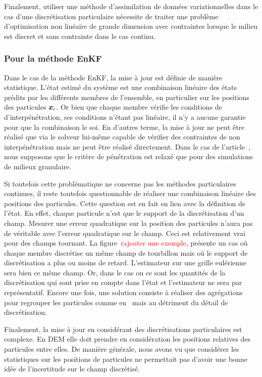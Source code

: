Finalement, utiliser une méthode d'assimilation de données variationnelles dans le cas d'une discrétisation particulaire nécessite de traiter une problème d'optimisation non linéaire de grande dimension avec contraintes lorsque le milieu est discret et sans contrainte dans le cas continu.

\subsubsection{Pour la méthode EnKF}

Dans le cas de la méthode EnKF, la mise à jour est définie de manière statistique. L'état estimé du système est une combinaison linéaire des états prédits par les différents membres de l'ensemble, en particulier sur les positions des particules $\bm{x}_i$. Or bien que chaque membre vérifie les conditions de d'interpénétration, ses conditions n'étant pas linéaire, il n'y a aucune garantie pour que la combinaison le soi.
En d'autres terme, la mise à jour ne peut être réalisé que via le solveur lui-même capable de vérifier des contraintes de non interpénétration mais ne peut être réalisé directement. Dans le cas de l'article~\cite{chen_superfloe_2022}, nous supposons que le critère de pénétration est relaxé que pour des simulations de milieux granulaire.

Si toutefois cette problématique ne concerne pas les méthodes particulaires continues, il reste toutefois questionnable de réaliser une combinaison linéaire des positions des particules. Cette question est en fait en lien avec la définition de l'état.
En effet, chaque particule n'est que le support de la discrétisation d'un champ. Mesurer une erreur quadratique sur la position des particules n'aura pas de véritable avec l'erreur quadratique sur le champ.
Ceci est relativement vrai pour des champs tournant. La figure~\textcolor{red}{rajouter une exemple}, présente un cas où chaque membre discrétise un même champ de tourbillon mais où le support de discrétisation a plus ou moins de retard. L'estimateur sur une grille eulérienne sera bien ce même champ. Or, dans le cas ou ce sont les quantités de la discrétisation qui sont prise en compte dans l'état et l'estimateur ne sera par représentatif.
Encore une fois, une solution consiste à réaliser des agrégations pour regrouper les particules comme en~\cite{chen_superfloe_2022,darakananda_data-assimilated_2018} mais au détriment du détail de discrétisation.

Finalement, la mise à jour en considérant des discrétisations particulaires est complexe. En DEM elle doit prendre en considération les positions relatives des particules entre elles. De manière générale, nous avons vu que considérer les statistiques sur les positions de particules ne permettait pas d'avoir une bonne idée de l'incertitude sur le champ discrétisé.

